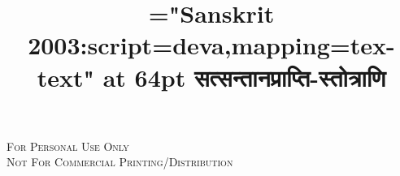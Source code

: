 \thispagestyle{empty}
\title{\font\x="Sanskrit 2003:script=deva,mapping=tex-text" at 64pt \x सत्सन्तानप्राप्ति-स्तोत्राणि}
\author{}
\date{}
\maketitle
%
\begin{center}

\vspace*{8cm}

\setmainfont{Candara}
{\large
\scshape{For Personal Use Only\\
 Not For Commercial Printing/Distribution}
}
\end{center}


\clearemptydoublepage
\setmainfont{Sanskrit 2003:script=deva}
\setcounter{page}{0}
\renewcommand{\chaptermark}[1]{%
\markboth{\tiny #1}{}}
\begin{center}
\begin{large}
\tableofcontents
\end{large}
\end{center}

\mbox{}
\clearpage
\thispagestyle{empty}
\clearemptydoublepage

%
